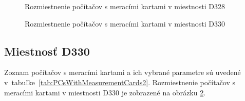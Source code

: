 \documentclass[a4paper, 10pt, ]{article}
\begin{document}
\begin{figure}[t]
    \centering

    \makebox[\textwidth][c]{%
    
    }

    \caption{Rozmiestnenie počítačov s meracími kartami v miestnosti D328} 
    \label{D328map_v1}

\end{figure}



\begin{figure}[t]
    \centering

    \makebox[\textwidth][c]{%
    
    }

    \caption{Rozmiestnenie počítačov s meracími kartami v miestnosti D330} 
    \label{D330map_v1}

\end{figure}



\subsection{Miestnosť D330}

Zoznam počítačov s meracími kartami a ich vybrané parametre sú uvedené v~tabuľke~\ref{tab:PCsWithMeasurementCards2}. Rozmiestnenie počítačov s meracími kartami v miestnosti D330 je zobrazené na obrázku \ref{D330map_v1}.
\end{document}

